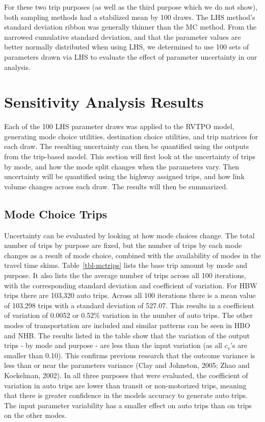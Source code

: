 \documentclass[
  futuretransp,
  submit,
  moreauthors,
]{Definitions/mdpi}
\begin{document}
For these two trip purposes (as well as the third purpose which we do not show), 
both sampling methods had a stabilized mean by 100 draws. 
The LHS method's standard deviation ribbon was generally
thinner than the MC method. From the narrowed cumulative standard
deviation, and that the parameter values are better normally distributed
when using LHS, we determined to use 100 sets of parameters drawn via LHS to
evaluate the effect of parameter uncertainty in our analysis.


\section{Sensitivity Analysis Results}\label{sec-results}

Each of the 100 LHS parameter draws was applied to the RVTPO model,
generating mode choice utilities, destination choice utilities, and trip
matrices for each draw. The resulting uncertainty can then be quantified
using the outputs from the trip-based model. This section will first
look at the uncertainty of trips by mode, and how the mode split changes
when the parameters vary. Then uncertainty will be quantified using the
highway assigned trips, and how link volume changes across each draw.
The results will then be summarized.

\subsection{Mode Choice Trips}\label{mode-choice-trips}

Uncertainty can be evaluated by looking at how mode choices change. The
total number of trips by purpose are fixed, but the number of trips by
each mode changes as a result of mode choice, combined with the
availability of modes in the travel time skims. Table~\ref{tbl-mctrips}
lists the base trip amount by mode and purpose. It also lists the the
average number of trips across all 100 iterations, with the
corresponding standard deviation and coefficient of variation. For HBW
trips there are 103,320 auto trips. Across all 100 iterations there is a
mean value of 103,298 trips with a standard deviation of 527.07. This
results in a coefficient of variation of 0.0052 or 0.52\% variation in
the number of auto trips. The other modes of transportation are included
and similar patterns can be seen in HBO and NHB. The results listed in
the table show that the variation of the output trips - by mode and
purpose - are less than the input variation (as all \(c_v\)'s are
smaller than 0.10). This confirms previous research that the outcome
variance is less than or near the parameters variance (Clay and
Johnston, 2005; Zhao and Kockelman, 2002). In all three purposes that
were evaluated, the coefficient of variation in auto trips are lower
than transit or non-motorized trips, meaning that there is greater
confidence in the models accuracy to generate auto trips. The input
parameter variability has a smaller effect on auto trips than on trips
on the other modes.
\end{document}
